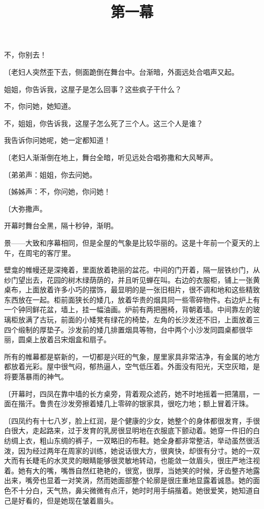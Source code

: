 不，你别去！

{\fangsong〔老妇人突然歪下去，侧面跪倒在舞台中。台渐暗，外面远处合唱声又起。}

姐姐，你告诉我，这屋子是怎么回事？这些疯子干什么？

不，你问她，她知道。

不，姐姐，你告诉我，这屋子怎么死了三个人。这三个人是谁？

我告诉你问她呢，她一定都知道！

{\fangsong〔老妇人渐渐倒在地上，舞台全暗，听见远处合唱弥撒和大风琴声。}

{\fangsong〔弟弟声：姐姐，你去问她。}

{\fangsong〔姊姊声：不，你问她，你问她！}

{\fangsong〔大弥撒声。}

\title{第一幕}

开幕时舞台全黑，隔十秒钟，渐明。

景——大致和序幕相同，但是全屋的气象是比较华丽的。这是十年前一个夏天的上午，在周宅的客厅里。

壁龛的帷幔还是深掩着，里面放着艳丽的盆花。中间的门开着，隔一层铁纱门，从纱门望出去，花园的树木绿荫荫的，并且听见蝉在叫。右边的衣服柜，铺上一张黄桌布，上面放着许多小巧的摆饰，最显明的是一张旧相片，很不调和地和这些精致东西放在一起。柜前面狭长的矮几，放着华贵的烟具同一些零碎物件。右边炉上有一个钟同鲜花盆，墙上，挂一幅油画。炉前有两把圈椅，背朝着墙。中间靠左的玻璃柜放满了古玩，前面的小矮凳有绿花的椅垫，左角的长沙发还不旧，上面放着三四个缎制的厚垫子。沙发前的矮几排置烟具等物，台中两个小沙发同圆桌都很华丽，圆桌上放着吕宋烟盒和扇子。

所有的帷幕都是崭新的，一切都是兴旺的气象，屋里家具非常洁净，有金属的地方都放着光彩。屋中很气闷，郁热逼人，空气低压着。外面没有阳光，天空灰暗，是将要落暴雨的神气。

{\fangsong〔开幕时，四凤在靠中墙的长方桌旁，背着观众滤药，她不时地摇着一把蒲扇，一面在揩汗。鲁贵在沙发旁擦着矮几上零碎的银家具，很吃力地；额上冒着汗珠。}

{\fangsong〔四凤约有十七八岁，脸上红润，是个健康的少女，她整个的身体都很发育，手很白很大，走起路来，过于发育的乳房很显明地在衣服底下颤动着。她穿一件旧的白纺绸上衣，粗山东绸的裤子，一双略旧的布鞋。她全身都非常整洁，举动虽然很活泼，因为经过两年在周家的训练，她说话很大方，很爽快，却很有分寸。她的一双大而有长睫毛的水灵灵的眼睛能够很灵敏地转动，也能敛一敛眉头，很庄严地注视着。她有大的嘴，嘴唇自然红艳艳的，很宽，很厚，当她笑的时候，牙齿整齐地露出来，嘴旁也显着一对笑涡，然而她面部整个轮廓是很庄重地显露着诚恳。她的面色不十分白，天气热，鼻尖微微有点汗，她时时用手绢揩着。她很爱笑，她知道自己是好看的，但是她现在皱着眉头。}


